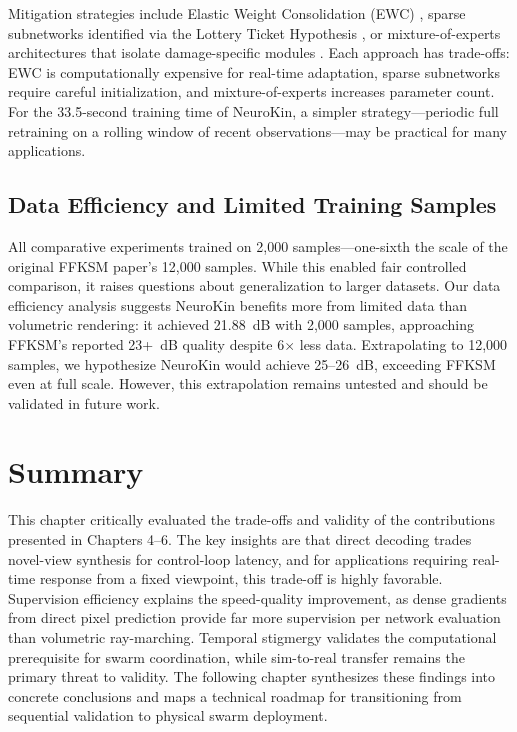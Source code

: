 \documentclass[12pt,a4paper,oneside]{report}
\begin{document}
Mitigation strategies include Elastic Weight Consolidation (EWC) \cite{kirkpatrick2017overcoming}, sparse subnetworks identified via the Lottery Ticket Hypothesis \cite{frankle2018lottery}, or mixture-of-experts architectures that isolate damage-specific modules \cite{mocanu2018scalable}. Each approach has trade-offs: EWC is computationally expensive for real-time adaptation, sparse subnetworks require careful initialization, and mixture-of-experts increases parameter count. For the 33.5-second training time of NeuroKin, a simpler strategy---periodic full retraining on a rolling window of recent observations---may be practical for many applications.

\subsection{Data Efficiency and Limited Training Samples}
All comparative experiments trained on 2,000 samples---one-sixth the scale of the original FFKSM paper's 12,000 samples. While this enabled fair controlled comparison, it raises questions about generalization to larger datasets. Our data efficiency analysis suggests NeuroKin benefits more from limited data than volumetric rendering: it achieved 21.88~dB with 2,000 samples, approaching FFKSM's reported 23+~dB quality despite 6$\times$ less data. Extrapolating to 12,000 samples, we hypothesize NeuroKin would achieve 25--26~dB, exceeding FFKSM even at full scale. However, this extrapolation remains untested and should be validated in future work.

\section{Summary}
This chapter critically evaluated the trade-offs and validity of the contributions presented in Chapters 4--6. The key insights are that direct decoding trades novel-view synthesis for control-loop latency, and for applications requiring real-time response from a fixed viewpoint, this trade-off is highly favorable. Supervision efficiency explains the speed-quality improvement, as dense gradients from direct pixel prediction provide far more supervision per network evaluation than volumetric ray-marching. Temporal stigmergy validates the computational prerequisite for swarm coordination, while sim-to-real transfer remains the primary threat to validity. The following chapter synthesizes these findings into concrete conclusions and maps a technical roadmap for transitioning from sequential validation to physical swarm deployment.
\end{document}
